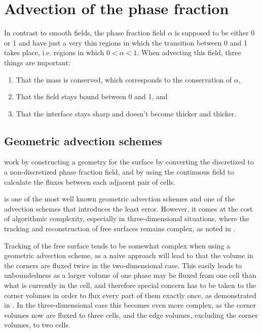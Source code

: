 \section{Advection of the phase fraction}

In contrast to smooth fields, the phase fraction field $\alpha$ is supposed to be either 0 or 1 and have just a very thin regions in which the transition between 0 and 1 takes place, i.e. regions in which $0 < \alpha < 1$. When advecting this field, three things are important:

\begin{enumerate}
\item That the mass is conserved, which corresponds to the conservation of $\alpha$,
\item That the field stays bound between 0 and 1, and
\item That the interface stays sharp and doesn't become thicker and thicker.
\end{enumerate}

\subsection{Geometric advection schemes}

 work by constructing a geometry for the surface by converting the discretized  to a non-discretized phase fraction field, and by using the continuous field to calculate the fluxes between each adjacent pair of cells.

\PLIC is one of the most well known geometric advection schemes and one of the advection schemes that introduces the least error. However, it comes at the cost of algorithmic complexity, especially in three-dimensional situations, where the tracking and reconstruction of free surfaces remains complex, as noted in \citep{Ingram2009}.

Tracking of the free surface tends to be somewhat complex when using a geometric advection scheme, as a naive approach will lead to that the volume in the corners are fluxed twice in the two-dimensional case. This easily leads to unboundedness as a larger volume of one phase may be fluxed from one cell than what is currently in the cell, and therefore special concern has to be taken to the corner volumes in order to flux every part of them exactly once, as demonstrated in \citep{Rider1998}. In the three-dimensional case this becomes even more complex, as the corner volumes now are fluxed to three cells, and the edge volumes, excluding the corner volumes, to two cells.


